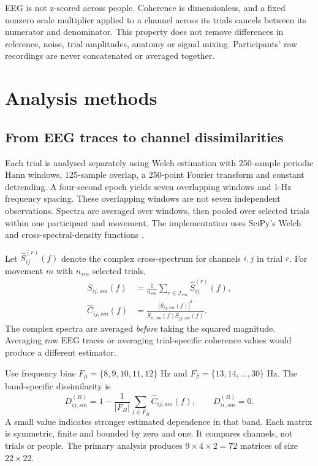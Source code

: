 \documentclass[11pt,a4paper]{article}
\begin{document}
EEG is not z-scored across people. Coherence is dimensionless, and a fixed nonzero scale multiplier applied to a channel across its trials cancels between its numerator and denominator. This property does not remove differences in reference, noise, trial amplitudes, anatomy or signal mixing. Participants' raw recordings are never concatenated or averaged together.

\section{Analysis methods}
\subsection{From EEG traces to channel dissimilarities}
Each trial is analysed separately using Welch estimation with 250-sample periodic Hann windows, 125-sample overlap, a 250-point Fourier transform and constant detrending. A four-second epoch yields seven overlapping windows and 1-Hz frequency spacing. These overlapping windows are not seven independent observations. Spectra are averaged over windows, then pooled over selected trials within one participant and movement. The implementation uses SciPy's Welch and cross-spectral-density functions \cite{scipycsd}.

Let $\widehat S^{(r)}_{ij}(f)$ denote the complex cross-spectrum for channels $i,j$ in trial $r$. For movement $m$ with $n_{sm}$ selected trials,
\begin{align}
 \overline S_{ij,sm}(f)&=\frac{1}{n_{sm}}\sum_{r\in\mathcal I_{sm}}\widehat S^{(r)}_{ij}(f),\\
 \widehat C_{ij,sm}(f)&=\frac{|\overline S_{ij,sm}(f)|^2}
 {\overline S_{ii,sm}(f)\overline S_{jj,sm}(f)}.
\end{align}
The complex spectra are averaged \emph{before} taking the squared magnitude. Averaging raw EEG traces or averaging trial-specific coherence values would produce a different estimator.

Use frequency bins $F_\mu=\{8,9,10,11,12\}$ Hz and $F_\beta=\{13,14,\ldots,30\}$ Hz. The band-specific dissimilarity is
\begin{equation}
 D^{(B)}_{ij,sm}=1-\frac{1}{|F_B|}\sum_{f\in F_B}\widehat C_{ij,sm}(f),
 \qquad D^{(B)}_{ii,sm}=0.
\end{equation}
A small value indicates stronger estimated dependence in that band. Each matrix is symmetric, finite and bounded by zero and one. It compares channels, not trials or people. The primary analysis produces $9\times4\times2=72$ matrices of size $22\times22$.
\end{document}
